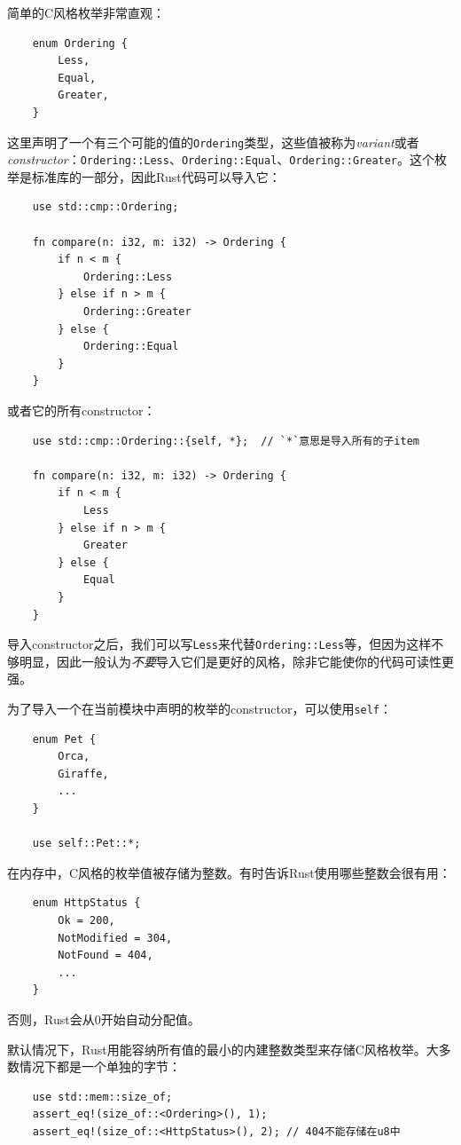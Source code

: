 简单的C风格枚举非常直观：
\begin{verbatim}
    enum Ordering {
        Less,
        Equal,
        Greater,
    }
\end{verbatim}

这里声明了一个有三个可能的值的\texttt{Ordering}类型，这些值被称为\emph{variant}或者\emph{constructor}：\texttt{Ordering::Less}、\texttt{Ordering::Equal}、\texttt{Ordering::Greater}。这个枚举是标准库的一部分，因此Rust代码可以导入它：
\begin{verbatim}
    use std::cmp::Ordering;

    fn compare(n: i32, m: i32) -> Ordering {
        if n < m {
            Ordering::Less
        } else if n > m {
            Ordering::Greater
        } else {
            Ordering::Equal
        }
    }
\end{verbatim}

或者它的所有constructor：
\begin{verbatim}
    use std::cmp::Ordering::{self, *};  // `*`意思是导入所有的子item

    fn compare(n: i32, m: i32) -> Ordering {
        if n < m {
            Less
        } else if n > m {
            Greater
        } else {
            Equal
        }
    }
\end{verbatim}

导入constructor之后，我们可以写\texttt{Less}来代替\texttt{Ordering::Less}等，但因为这样不够明显，因此一般认为\emph{不要}导入它们是更好的风格，除非它能使你的代码可读性更强。

为了导入一个在当前模块中声明的枚举的constructor，可以使用\texttt{self}：
\begin{verbatim}
    enum Pet {
        Orca,
        Giraffe,
        ...
    }

    use self::Pet::*;
\end{verbatim}

在内存中，C风格的枚举值被存储为整数。有时告诉Rust使用哪些整数会很有用：
\begin{verbatim}
    enum HttpStatus {
        Ok = 200,
        NotModified = 304,
        NotFound = 404,
        ...
    }
\end{verbatim}

否则，Rust会从0开始自动分配值。

默认情况下，Rust用能容纳所有值的最小的内建整数类型来存储C风格枚举。大多数情况下都是一个单独的字节：
\begin{verbatim}
    use std::mem::size_of;
    assert_eq!(size_of::<Ordering>(), 1);
    assert_eq!(size_of::<HttpStatus>(), 2); // 404不能存储在u8中
\end{verbatim}

